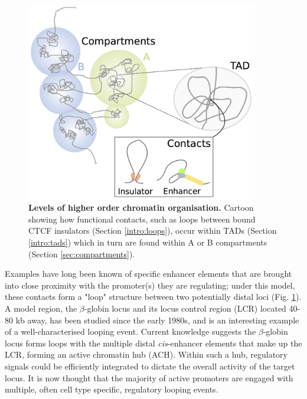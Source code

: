 \documentclass[a4paper,11pt,oneside]{book}
\begin{document}
\begin{figure}
\begin{center}
\includegraphics[width=4in]{figs/genome_org.png}
\captionsetup{width=\textwidth}
\caption[Levels of higher order chromatin organisation.]{ {\bf Levels of higher order chromatin organisation. } 
  Cartoon showing how functional contacts, such as loops between bound CTCF insulators (Section \ref{intro:loops}), occur within TADs (Section \ref{intro:tads}) which in turn are found within A or B compartments (Section \ref{sec:compartments}).
}\label{fig:genomeorg}
\end{center}
\end{figure} 

Examples have long been known of specific enhancer elements that are brought into close proximity with the promoter(s) they are regulating; under this model, these contacts form a "loop" structure between two potentially distal loci\cite{Kadauke2009a, Sexton2009} (Fig. \ref{fig:genomeorg}). A model region, the $\beta$-globin locus and its locus control region (LCR) located 40-80 kb away,\cite{Dekker2013} has been studied since the early 1980s,\cite{Banerji1981, Engel2000, Blackwood1998, Tolhuis2002} and is an interesting example of a well-characterised looping event. Current knowledge suggests the $\beta$-globin locus forms loops with the multiple distal \emph{cis}-enhancer elements that make up the LCR, forming an active chromatin hub (ACH).\cite{VandeCorput2012a} Within such a hub, regulatory signals could be efficiently integrated to dictate the overall activity of the target locus.\cite{DeWit2012, Pombo2015} It is now thought that the majority of active promoters are engaged with multiple, often cell type specific, regulatory looping events.\cite{Sanyal2012, Jin2013}
\end{document}
